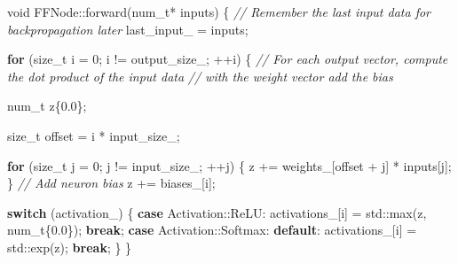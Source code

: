 \documentclass[
]{article}
\newenvironment{Shaded}{}{}
\newcommand{\BuiltInTok}[1]{#1}
\newcommand{\CommentTok}[1]{\textcolor[rgb]{0.38,0.63,0.69}{\textit{#1}}}
\newcommand{\ControlFlowTok}[1]{\textcolor[rgb]{0.00,0.44,0.13}{\textbf{#1}}}
\newcommand{\DataTypeTok}[1]{\textcolor[rgb]{0.56,0.13,0.00}{#1}}
\newcommand{\DecValTok}[1]{\textcolor[rgb]{0.25,0.63,0.44}{#1}}
\newcommand{\FloatTok}[1]{\textcolor[rgb]{0.25,0.63,0.44}{#1}}
\newcommand{\NormalTok}[1]{#1}
\newcommand{\VariableTok}[1]{\textcolor[rgb]{0.10,0.09,0.49}{#1}}
\begin{document}
\begin{Shaded}
\begin{Highlighting}[]
\DataTypeTok{void}\NormalTok{ FFNode::forward(}\DataTypeTok{num\_t}\NormalTok{* inputs)}
\NormalTok{\{}
    \CommentTok{// Remember the last input data for backpropagation later}
    \VariableTok{last\_input\_}\NormalTok{ = inputs;}

    \ControlFlowTok{for}\NormalTok{ (}\DataTypeTok{size\_t}\NormalTok{ i = }\DecValTok{0}\NormalTok{; i != }\VariableTok{output\_size\_}\NormalTok{; ++i)}
\NormalTok{    \{}
        \CommentTok{// For each output vector, compute the dot product of the input data}
        \CommentTok{// with the weight vector add the bias}

        \DataTypeTok{num\_t}\NormalTok{ z\{}\FloatTok{0.0}\NormalTok{\};}

        \DataTypeTok{size\_t}\NormalTok{ offset = i * }\VariableTok{input\_size\_}\NormalTok{;}

        \ControlFlowTok{for}\NormalTok{ (}\DataTypeTok{size\_t}\NormalTok{ j = }\DecValTok{0}\NormalTok{; j != }\VariableTok{input\_size\_}\NormalTok{; ++j)}
\NormalTok{        \{}
\NormalTok{            z += }\VariableTok{weights\_}\NormalTok{[offset + j] * inputs[j];}
\NormalTok{        \}}
        \CommentTok{// Add neuron bias}
\NormalTok{        z += }\VariableTok{biases\_}\NormalTok{[i];}

        \ControlFlowTok{switch}\NormalTok{ (}\VariableTok{activation\_}\NormalTok{)}
\NormalTok{        \{}
        \ControlFlowTok{case}\NormalTok{ Activation::ReLU:}
            \VariableTok{activations\_}\NormalTok{[i] = }\BuiltInTok{std::}\NormalTok{max(z, }\DataTypeTok{num\_t}\NormalTok{\{}\FloatTok{0.0}\NormalTok{\});}
            \ControlFlowTok{break}\NormalTok{;}
        \ControlFlowTok{case}\NormalTok{ Activation::Softmax:}
        \ControlFlowTok{default}\NormalTok{:}
            \VariableTok{activations\_}\NormalTok{[i] = }\BuiltInTok{std::}\NormalTok{exp(z);}
            \ControlFlowTok{break}\NormalTok{;}
\NormalTok{        \}}
\NormalTok{    \}}


\end{Highlighting}
\end{Shaded}
\end{document}
